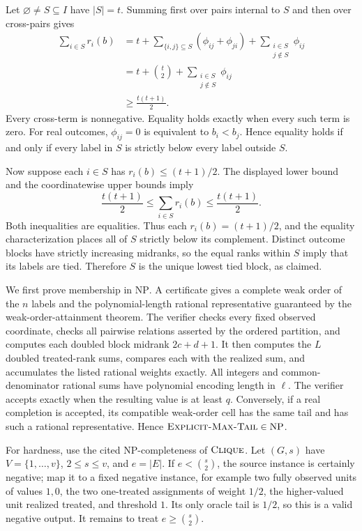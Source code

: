 Let \(\varnothing\ne S\subseteq I\) have \(|S|=t\).  Summing first over pairs internal to \(S\) and then over cross-pairs gives
\[
\begin{aligned}
\sum_{i\in S}r_i(b)
&=t+\sum_{\{i,j\}\subseteq S}(\phi_{ij}+\phi_{ji})
  +\sum_{\substack{i\in S\\ j\notin S}}\phi_{ij}\\
&=t+\binom{t}{2}
  +\sum_{\substack{i\in S\\ j\notin S}}\phi_{ij}\\
&\ge \frac{t(t+1)}2.
\end{aligned}
\]
Every cross-term is nonnegative.  Equality holds exactly when every such term is zero.  For real outcomes, \(\phi_{ij}=0\) is equivalent to \(b_i<b_j\).  Hence equality holds if and only if every label in \(S\) is strictly below every label outside \(S\).

Now suppose each \(i\in S\) has \(r_i(b)\le(t+1)/2\).  The displayed lower bound and the coordinatewise upper bounds imply
\[
\frac{t(t+1)}2
\le\sum_{i\in S}r_i(b)
\le\frac{t(t+1)}2.
\]
Both inequalities are equalities.  Thus each \(r_i(b)=(t+1)/2\), and the equality characterization places all of \(S\) strictly below its complement.  Distinct outcome blocks have strictly increasing midranks, so the equal ranks within \(S\) imply that its labels are tied.  Therefore \(S\) is the unique lowest tied block, as claimed.

We first prove membership in \(\mathrm{NP}\).  A certificate gives a complete weak order of the \(n\) labels and the polynomial-length rational representative guaranteed by the weak-order-attainment theorem.  The verifier checks every fixed observed coordinate, checks all pairwise relations asserted by the ordered partition, and computes each doubled block midrank \(2c+d+1\).  It then computes the \(L\) doubled treated-rank sums, compares each with the realized sum, and accumulates the listed rational weights exactly.  All integers and common-denominator rational sums have polynomial encoding length in \(\ell\).  The verifier accepts exactly when the resulting value is at least \(q\).  Conversely, if a real completion is accepted, its compatible weak-order cell has the same tail and has such a rational representative.  Hence \(\textsc{Explicit-Max-Tail}\in\mathrm{NP}\).

For hardness, use the cited NP-completeness of \(\textsc{Clique}\).  Let \((G,s)\) have \(V=\{1,\ldots,v\}\), \(2\le s\le v\), and \(e=|E|\).  If \(e<\binom{s}{2}\), the source instance is certainly negative; map it to a fixed negative instance, for example two fully observed units of values \(1,0\), the two one-treated assignments of weight \(1/2\), the higher-valued unit realized treated, and threshold \(1\).  Its only oracle tail is \(1/2\), so this is a valid negative output.  It remains to treat \(e\ge\binom{s}{2}\).

